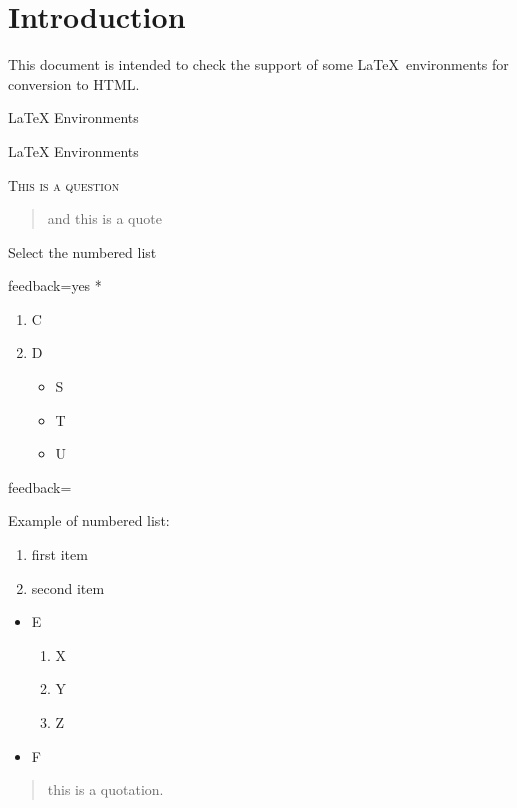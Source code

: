 \documentclass{article}
\begin{document}
\section*{Introduction}

This document is intended to check the support of some \LaTeX\ environments for 
conversion to HTML.

\begin{quiz}[points=1.0]{LaTeX Environments}
\begin{multi}{LaTeX Environments}
\begin{center}
\textsc{This is a question}
\end{center}
\begin{quote}
and this is a quote
\end{quote}

Select the numbered list
\item[feedback={yes}]* \begin{enumerate}
         \item C
         \item D
         \begin{itemize}
           \item S
           \item T
           \item U
          \end{itemize}  
       \end{enumerate}
\item[feedback={Example of numbered list:\\\begin{enumerate}
\item first item
\item second item
\end{enumerate}
}] \begin{itemize}
         \item E
         \begin{enumerate}
         \item X
         \item Y
         \item Z
         \end{enumerate}
         \item F
      \end{itemize}
\item \begin{quotation}
this is a quotation.
\end{quotation}
\end{multi}
\end{quiz}
\end{document}
